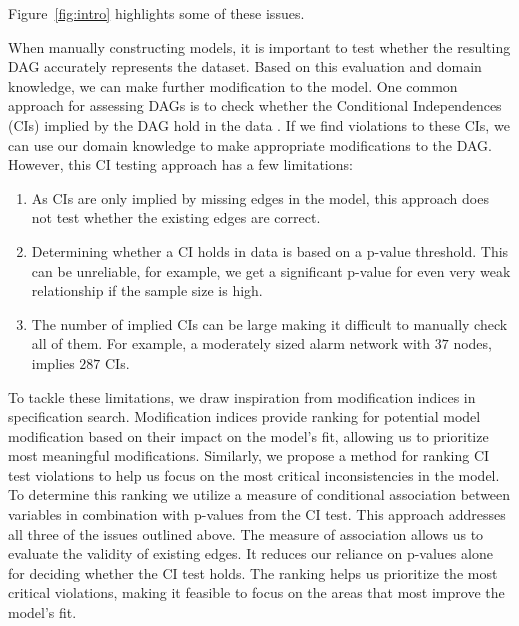 \documentclass{uai2025} %
\begin{document}
Figure~\ref{fig:intro} highlights some of these issues. 

When manually constructing models, it is important to test whether the
resulting DAG accurately represents the dataset. Based on this evaluation and
domain knowledge, we can make further modification to the model. One common
approach for assessing DAGs is to check whether the Conditional Independences
(CIs) implied by the DAG hold in the data \citep{Ankan2021}. If we find
violations to these CIs, we can use our domain knowledge to make appropriate
modifications to the DAG. However, this CI testing approach has a few
limitations:

\begin{enumerate}
\item As CIs are only implied by missing edges in the model, this approach does 
	not test whether the existing edges are correct.
\item Determining whether a CI holds in data is based on a p-value threshold. This can 
	be unreliable, for example, we get a significant p-value for even very weak 
	relationship if the sample size is high.
\item The number of implied CIs can be large making it difficult to manually
	check all of them. For example, a moderately sized alarm network
	\citep{Beinlich1989} with $ 37 $ nodes, implies $ 287 $ CIs.
\end{enumerate}

To tackle these limitations, we draw inspiration from modification indices in
specification search. Modification indices provide ranking for potential model
modification based on their impact on the model's fit, allowing us to
prioritize most meaningful modifications.  Similarly, we propose a method for
ranking CI test violations to help us focus on the most critical
inconsistencies in the model. To determine this ranking we utilize a measure of
conditional association between variables in combination with p-values from the
CI test. This approach addresses all three of the issues outlined above. The
measure of association allows us to evaluate the validity of existing edges. It
reduces our reliance on p-values alone for deciding whether the CI test holds.
The ranking helps us prioritize the most critical violations, making it feasible 
to focus on the areas that most improve the model's fit.
\end{document}
